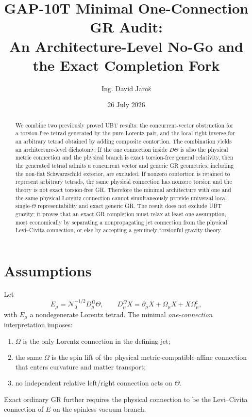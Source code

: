 \documentclass[11pt,a4paper]{article}
\title{GAP-10T Minimal One-Connection GR Audit:\\
An Architecture-Level No-Go and the Exact Completion Fork}
\author{Ing. David Jaro\v{s}}
\date{26 July 2026}
\newcommand{\dd}{\ddagger}
\begin{document}
\maketitle
\UBTProvenanceNotice

\begin{abstract}
We combine two previously proved UBT results: the concurrent-vector obstruction
for a torsion-free tetrad generated by the pure Lorentz pair, and the local
right inverse for an arbitrary tetrad obtained by adding composite contortion.
The combination yields an architecture-level dichotomy. If the one connection
inside $D\Theta$ is also the physical metric connection and the physical branch
is exact torsion-free general relativity, then the generated tetrad admits a
concurrent vector and generic GR geometries, including the non-flat
Schwarzschild exterior, are excluded. If nonzero contortion is retained to
represent arbitrary tetrads, the same physical connection has nonzero torsion
and the theory is not exact torsion-free GR. Therefore the minimal architecture
with one and the same physical Lorentz connection cannot simultaneously provide
universal local single-$\Theta$ representability and exact generic GR. The
result does not exclude UBT gravity; it proves that an exact-GR completion must
relax at least one assumption, most economically by separating a nonpropagating
jet connection from the physical Levi--Civita connection, or else by accepting
a genuinely torsionful gravity theory.
\end{abstract}

\section{Assumptions}
Let
\begin{equation}
 E_\mu=\mathcal N_0^{-1/2}D^{\Omega}_\mu\Theta,
 \qquad
 D^{\Omega}_\mu X=\partial_\mu X+\Omega_\mu X+X\Omega_\mu^{\dd},
 \label{eq:generated}
\end{equation}
with $E_\mu$ a nondegenerate Lorentz tetrad.  The minimal
\emph{one-connection} interpretation imposes:
\begin{enumerate}
 \item $\Omega$ is the only Lorentz connection in the defining jet;
 \item the same $\Omega$ is the spin lift of the physical metric-compatible
 affine connection that enters curvature and matter transport;
 \item no independent relative left/right connection acts on $\Theta$.
\end{enumerate}
Exact ordinary GR further requires the physical connection to be the
Levi--Civita connection of $E$ on the spinless vacuum branch.
\end{document}
